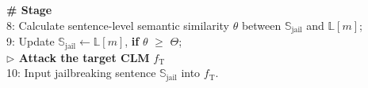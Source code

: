 \begin{algorithm}[h]
{{\textbf{\# Stage \uppercase\expandafter{}}}\\
8: Calculate sentence-level semantic similarity $\theta$ between $\mathbb{S}_\text{jail}$ and $\mathbb{L}[m]$;\\
9: Update $\mathbb{S}_\text{jail} \leftarrow \mathbb{L}[m]$, \textbf{if} $\theta$ $\geq$ $\Theta$;\\
\textbf{$\triangleright$ Attack the target CLM} $f_{\text{T}}$\\
10: Input jailbreaking sentence $\mathbb{S}_\text{jail}$ into $f_{\text{T}}$.
}
\end{algorithm}
